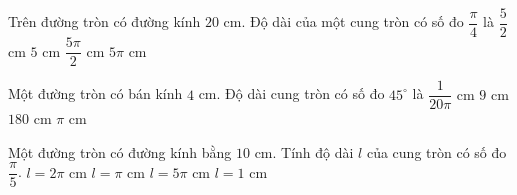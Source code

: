 \begin{ex}%
	Trên đường tròn có đường kính $20$ cm. Độ dài của một cung tròn có số đo $\dfrac{\pi}{4}$ là
	\choice
	{$\dfrac{5}{2}$ cm}
	{$5$ cm}
	{\True $\dfrac{5\pi}{2}$ cm}
	{$5\pi$ cm}
\end{ex}

\begin{ex}%
	Một đường tròn có bán kính $4 $ cm. Độ dài cung tròn có số đo $45^{\circ}$ là
	\choice
	{$\dfrac{1}{20 \pi} $ cm}
	{$9 $ cm}
	{$180 $ cm}
	{\True $\pi $ cm}
\end{ex}

\begin{ex}%
	Một đường tròn có đường kính bằng $10 \text{ cm}$. Tính độ dài $l$ của cung tròn có số đo $\dfrac{\pi}{5}$.
	\choice
	{\True $l=2 \pi\text{ cm}$}
	{$l=\pi\text{ cm}$}
	{$l=5 \pi\text{ cm}$}
	{$l=1\text{ cm}$}
\end{ex}


